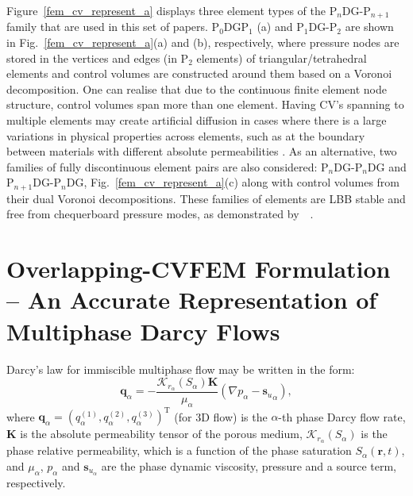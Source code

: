 \documentclass[preprint,authoryear,12pt]{elsarticle}
\newcommand{\JGnote}[1]{\fbox{\parbox{\textwidth}{ \color{blue} JG: #1}}}
\begin{document}
Figure~\ref{fem_cv_represent_a} displays three element types of the P$_{n}$DG-P$_{n+1}$ family that are used in this set of papers. P$_{\text{0}}$DGP$_{\text{1}}$ (a)  and P$_{1}$DG-P$_{2}$ are shown in Fig.~\ref{fem_cv_represent_a}(a) and (b), respectively, where pressure nodes are stored in the vertices and edges (in P$_{\text{2}}$ elements) of triangular/tetrahedral elements and control volumes are constructed around them based on a Voronoi decomposition.  One can realise that due to the continuous finite element node structure, control volumes span more than one element. Having CV's spanning to multiple elements may create artificial diffusion in cases where there is a large variations in physical properties across elements, such as at the boundary between materials with different absolute permeabilities . As an alternative, two families of fully discontinuous element pairs are also considered: P$_{n}$DG-P$_{n}$DG and P$_{n+1}$DG-P$_{n}$DG, Fig.~\ref{fem_cv_represent_a}(c) along with control volumes from their dual Voronoi decompositions. These families of elements are LBB stable and free from chequerboard pressure modes, as demonstrated by~\citet{cotter_2009b}~\citep[see also][]{cotter_2011}.


\section{Overlapping-CVFEM Formulation -- An Accurate Representation of Multiphase Darcy Flows}
\label{overlapping_method_section}
Darcy's law for immiscible multiphase flow may be written \citep{chen_2006} in the form:%
\begin{equation}\label{e:darcy_eqn}
  \mathbf{q}_{\alpha} = -\frac{\mathcal{K}_{{r}_\alpha}\left(S_{\alpha}\right)\mathbf{K}}{\mu_{\alpha}}\left( \nabla p_{\alpha} - {\mathbf{s}_{u}}_{\alpha} \right),
\end{equation}
where $\mathbf{q}_{\alpha}=\left(q_\alpha^{(1)},q_\alpha^{(2)},q_\alpha^{(3)}\right)^{\text{T}}$ (for 3D flow) is the $\alpha$-th phase Darcy flow rate, $\mathbf{K}$ is the absolute permeability tensor of the porous medium, $\mathcal{K}_{{r}_\alpha}\left(S_{\alpha}\right)$ is the phase relative permeability, which is a function of the phase saturation $S_{\alpha}\left(\mathbf{r},t\right)$, and $\mu_{\alpha}$, $p_{\alpha}$ and $\mathbf{s}_{{u}_\alpha}$ are the phase dynamic viscosity, pressure and a source term, respectively.
\end{document}
